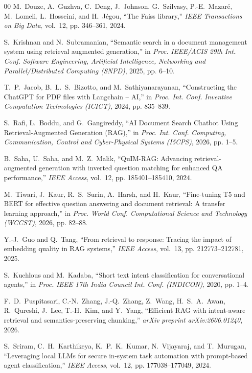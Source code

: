 \documentclass[a4paper,12pt]{article}
\begin{document}
\begin{thebibliography}{00}
M.~Douze, A.~Guzhva, C.~Deng, J.~Johnson, G.~Szilvasy, P.-E.~Mazar{\'e}, M.~Lomeli, L.~Hosseini, and H.~J{\'e}gou, ``The Faiss library,'' \emph{IEEE Transactions on Big Data}, vol.~12, pp. 346--361, 2024.

S.~Krishnan and N.~Subramanian, ``Semantic search in a document management system using retrieval augmented generation,'' in \emph{Proc. IEEE/ACIS 29th Int. Conf. Software Engineering, Artificial Intelligence, Networking and Parallel/Distributed Computing (SNPD)}, 2025, pp. 6--10.

T.~P.~Jacob, B.~L.~S.~Bizotto, and M.~Sathiyanarayanan, ``Constructing the ChatGPT for PDF files with Langchain -- AI,'' in \emph{Proc. Int. Conf. Inventive Computation Technologies (ICICT)}, 2024, pp. 835--839.

S.~Rafi, L.~Boddu, and G.~Gangireddy, ``AI Document Search Chatbot Using Retrieval-Augmented Generation (RAG),'' in \emph{Proc. Int. Conf. Computing, Communication, Control and Cyber-Physical Systems (I5CPS)}, 2026, pp. 1--5.

B.~Saha, U.~Saha, and M.~Z.~Malik, ``QuIM-RAG: Advancing retrieval-augmented generation with inverted question matching for enhanced QA performance,'' \emph{IEEE Access}, vol.~12, pp. 185401--185410, 2024.

M.~Tiwari, J.~Kaur, R.~S.~Surin, A.~Harsh, and H.~Kaur, ``Fine-tuning T5 and BERT for effective question answering and document retrieval: A transfer learning approach,'' in \emph{Proc. World Conf. Computational Science and Technology (WCCST)}, 2026, pp. 82--88.

Y.-J.~Guo and Q.~Tang, ``From retrieval to response: Tracing the impact of embedding quality in RAG systems,'' \emph{IEEE Access}, vol.~13, pp. 212773--212781, 2025.

S.~Kuchlous and M.~Kadaba, ``Short text intent classification for conversational agents,'' in \emph{Proc. IEEE 17th India Council Int. Conf. (INDICON)}, 2020, pp. 1--4.

F.~D.~Puspitasari, C.-N.~Zhang, J.-Q.~Zhang, Z.~Wang, H.~S.~A.~Awan, R.~Qureshi, J.~Lee, T.-H.~Kim, and Y.~Yang, ``Efficient RAG with intent-aware retrieval and semantics-preserving chunking,'' \emph{arXiv preprint arXiv:2606.01240}, 2026.

S.~Sriram, C.~H.~Karthikeya, K.~P.~K.~Kumar, N.~Vijayaraj, and T.~Murugan, ``Leveraging local LLMs for secure in-system task automation with prompt-based agent classification,'' \emph{IEEE Access}, vol.~12, pp. 177038--177049, 2024.


\end{thebibliography}
\end{document}
